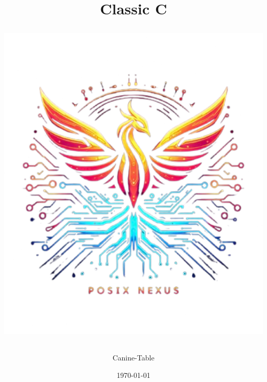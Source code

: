 \documentclass[a4paper,12pt]{article}
\begin{document}
	\label{top}
	\title{
		\hspace{24px}\textbf{Classic C}\hspace{4px}\\[10mm]
		\begin{NexMainBox}[dark, shpA,fit, width=\linewidth/2]
			\includegraphics[width=\textwidth]{img/posix-nexus.png}
		\end{NexMainBox}
	}
	\author{Canine-Table}
	\date{\today}
	\maketitle
	\newpage
	\begin{NexMainBox}[light, title=Contents, hdrB, breakable]
		\tableofcontents
	\end{NexMainBox}
	\newpage
	
\end{document}
